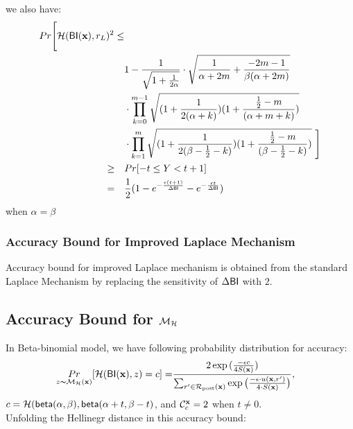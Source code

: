 \documentclass{article}
\begin{document}
\begin{itemize}
  we also have: 
  \begin{align*}
   Pr\Bigg[ \mathcal{H}(\mathsf{BI}(\textbf{x}), r_L )^2 \leq & \\
  \qquad &
  1 - \frac{1}{\sqrt{1 + \frac{1}{2\alpha}}} \cdot 
  \sqrt{\frac{1}{\alpha + 2m} + \frac{- 2m - 1}{\beta(\alpha + 2m)}} \\
  \qquad &\cdot 
  \prod_{k = 0}^{m-1}
  \sqrt{(1 + \frac{1}{2(\alpha + k)})
  (1 + \frac{\frac{1}{2} - m}{(\alpha + m  + k)})
  } \\
  \qquad & \cdot 
  \prod_{k = 1}^{m} 
  \sqrt{(1 + \frac{1}{2(\beta - \frac{1}{2}- k)})(1 + \frac{\frac{1}{2} - m}{(\beta - \frac{1}{2}- k)})}\ \Bigg] \\
  \geq \quad & Pr[ - t \leq Y < t + 1] \\
  = \quad & \frac{1}{2} (1 - e^{- \frac{\epsilon (t + 1)}{\Delta \mathsf{BI}}}- e^{- \frac{\epsilon t}{\Delta \mathsf{BI}}})
  \end{align*}
  when $\alpha = \beta$

\end{itemize} 

\subsubsection{Accuracy Bound for Improved Laplace Mechanism}
\label{subsec_accuracy_lap}
Accuracy bound for improved Laplace mechanism is obtained from the standard Laplace Mechanism by replacing the sensitivity of $\Delta \mathsf{BI}$ with $2$.



\subsection{Accuracy Bound for $\mathcal{M}_{\mathcal{H}}$}
\label{subsec_accuracy_smoo}
  In Beta-binomial model,
  we have following probability distribution for accuracy:
  \begin{align}
  \label{eq_acc}
  \underset{z \thicksim \mathcal{M}_{\mathcal{H}}(\textbf{x})}{Pr}[\mathcal{H}(\mathsf{BI}(\textbf{x}), z) = c] 
  = & \frac{2 \exp{(\frac{- \epsilon c}{4 S(\textbf{x})})}}{\sum_{r'\in \mathcal{R}_{\textup{post}}(\textbf{x})} \exp \big(\frac{-\epsilon\cdot u(\textbf{\textbf{x}}, r')}{4 \cdot S(\textbf{x})}\big)},
  \end{align}
  $c = \mathcal{H}(\mathsf{beta}(\alpha, \beta), \mathsf{beta}(\alpha + t, \beta - t)$, and $\mathcal{C}^{\textbf{x}}_{c} = 2$ when $t \neq 0$.\\
  Unfolding the Hellinegr distance in this accuracy bound:
\end{document}
